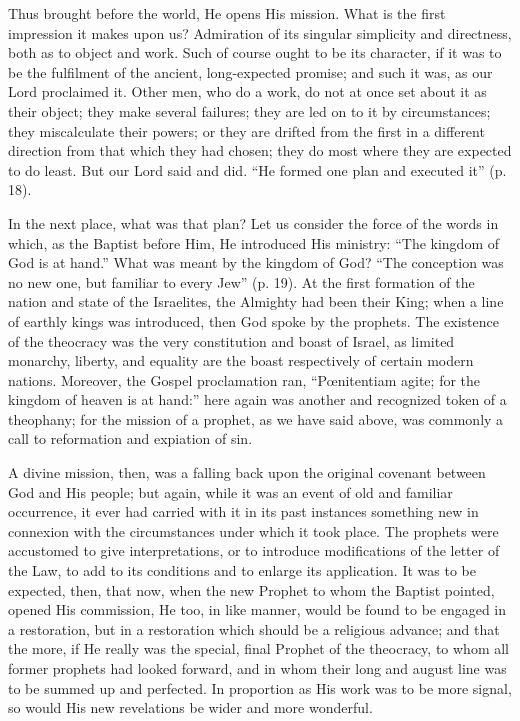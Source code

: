 Thus brought before the world, He opens His
mission. What is the first impression it makes upon us? Admiration of
its singular simplicity and directness, both as to object and work.
Such of course ought to be its character, if it was to be the
fulfilment of the ancient, long-expected promise; and such it was, as
our Lord proclaimed it. Other men, who do a work, do not at once set
about it as their object; they make several failures; they are led on
to it by circumstances; they miscalculate their powers; or they are
drifted from the first in a different direction from that which they
had chosen; they do most where they are expected to do least. But our
Lord said and did. ``He formed one plan and executed it'' (p. 18).

In the next place, what was that plan? Let us
consider the force of the words in which, as the Baptist before Him,
He introduced His ministry: ``The kingdom of God is at hand.'' What was
meant by the kingdom of God? ``The conception was no new one, but
familiar to every Jew'' (p. 19). At the first formation of the nation
and state of the Israelites, the Almighty had been their King; when a
line of earthly kings was introduced, then God spoke by the prophets.
The existence of the theocracy was the very constitution and boast of
Israel, as limited monarchy, liberty, and equality are the boast
respectively of certain modern nations. Moreover, the Gospel
proclamation ran, ``Pœnitentiam agite; for the kingdom of heaven is at
hand:'' here again was another and recognized token of a theophany; for
the mission of a prophet, as we have said above, was commonly a call
to reformation and expiation of sin.

A divine mission, then, was a falling back upon
the original covenant between God and His people; but again, while it
was an event of old and familiar occurrence, it ever had carried with
it in its past instances something new in connexion with the
circumstances under which it took place. The prophets were accustomed
to give interpretations, or to introduce modifications of the
letter of the Law, to add to its conditions and to enlarge its
application. It was to be expected, then, that now, when the new
Prophet to whom the Baptist pointed, opened His commission, He too, in
like manner, would be found to be engaged in a restoration, but in a
restoration which should be a religious advance; and that the more, if
He really was the special, final Prophet of the theocracy, to whom all
former prophets had looked forward, and in whom their long and august
line was to be summed up and perfected. In proportion as His work was
to be more signal, so would His new revelations be wider and more
wonderful.

